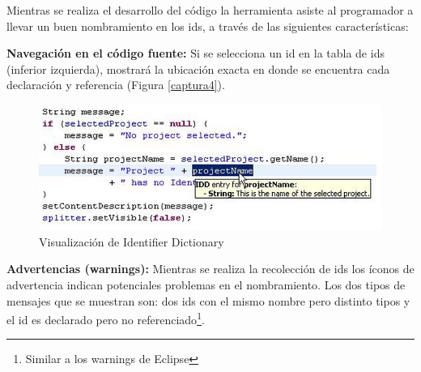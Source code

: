 \documentclass[a4paper,12pt]{report}
\begin{document}
Mientras se realiza el desarrollo del código la herramienta asiste al programador a llevar un buen nombramiento en los ids, a través de las siguientes características:

\textbf{Navegación en el código fuente:} Si se selecciona un id en la tabla de ids (inferior izquierda), mostrará la ubicación exacta en donde se encuentra cada declaración y referencia (Figura \ref{captura4}).


%

\begin{figure}[t] %
\centerline{%
\includegraphics[scale= 0.70]{./idd_7.png}
}
\caption{Visualización de Identifier Dictionary}
\label{captura8}
\end{figure}

\textbf{Advertencias (warnings):} Mientras se realiza la recolección de ids los íconos de advertencia indican potenciales problemas en el nombramiento.  Los dos tipos de mensajes que se muestran son: dos ids con el mismo nombre pero distinto tipos y el id es declarado pero no referenciado\footnote[1]{Similar a los warnings de Eclipse}.


\end{document}
